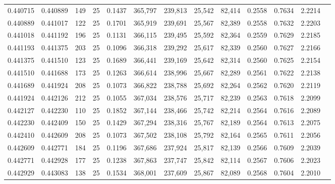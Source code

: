 \begin{tabular}{rrrrrrrrrrrrr}
0.440715 & 0.440889 &   149 &  25 &                                     0.1437 & 365,797 & 239,813 &  25,542 &  82,414 & 0.2558 & 0.7634 & 2.2214 \\
0.440889 & 0.441017 &   122 &  25 &                                     0.1701 & 365,919 & 239,691 &  25,567 &  82,389 & 0.2558 & 0.7632 & 2.2203 \\
0.441018 & 0.441192 &   196 &  25 &                                     0.1131 & 366,115 & 239,495 &  25,592 &  82,364 & 0.2559 & 0.7629 & 2.2185 \\
0.441193 & 0.441375 &   203 &  25 &                                     0.1096 & 366,318 & 239,292 &  25,617 &  82,339 & 0.2560 & 0.7627 & 2.2166 \\
0.441375 & 0.441510 &   123 &  25 &                                     0.1689 & 366,441 & 239,169 &  25,642 &  82,314 & 0.2560 & 0.7625 & 2.2154 \\
0.441510 & 0.441688 &   173 &  25 &                                     0.1263 & 366,614 & 238,996 &  25,667 &  82,289 & 0.2561 & 0.7622 & 2.2138 \\
0.441689 & 0.441924 &   208 &  25 &                                     0.1073 & 366,822 & 238,788 &  25,692 &  82,264 & 0.2562 & 0.7620 & 2.2119 \\
0.441924 & 0.442126 &   212 &  25 &                                     0.1055 & 367,034 & 238,576 &  25,717 &  82,239 & 0.2563 & 0.7618 & 2.2099 \\
0.442127 & 0.442230 &   110 &  25 &                                     0.1852 & 367,144 & 238,466 &  25,742 &  82,214 & 0.2564 & 0.7616 & 2.2089 \\
0.442230 & 0.442409 &   150 &  25 &                                     0.1429 & 367,294 & 238,316 &  25,767 &  82,189 & 0.2564 & 0.7613 & 2.2075 \\
0.442410 & 0.442609 &   208 &  25 &                                     0.1073 & 367,502 & 238,108 &  25,792 &  82,164 & 0.2565 & 0.7611 & 2.2056 \\
0.442609 & 0.442771 &   184 &  25 &                                     0.1196 & 367,686 & 237,924 &  25,817 &  82,139 & 0.2566 & 0.7609 & 2.2039 \\
0.442771 & 0.442928 &   177 &  25 &                                     0.1238 & 367,863 & 237,747 &  25,842 &  82,114 & 0.2567 & 0.7606 & 2.2023 \\
0.442929 & 0.443083 &   138 &  25 &                                     0.1534 & 368,001 & 237,609 &  25,867 &  82,089 & 0.2568 & 0.7604 & 2.2010 \\

\end{tabular}
